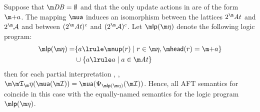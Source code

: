 \begin{theorem}\label{thm:lplink}
  Suppose that $\db=\emptyset$ and that the only update actions in \aics are of the form $\add a$.
  The mapping $\actof$ induces an isomorphism between the lattices $2^\atoms$ and $2^\acts$ and between $(2^\atoms)^c$ and $(2^\acts)^c$. 
  Let $\lpop(\aics)$ denote the following logic program:  
 \begin{align*}
  \lpop(\aics)=& \{a \lrule \nup(r)\mid r\in \aics, \head(r)= \add a\}\\
  &\cup \{a \lrule a\mid a \in \atoms\}
 \end{align*}
 then for each partial interpretation \pstruct, , $\Ap(\actof(\pstruct)) = \actof(\Psi_{\lpop(\aics)}(\pstruct))$. 
Hence, all AFT semantics for \fulldb coincide in this case with the equally-named semantics for the logic program $\lpop(\aics)$. 
\end{theorem}
